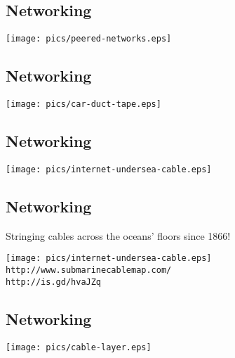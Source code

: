 \documentclass[xga]{xdvislides}
\begin{document}
\subsection{Networking}
\vspace*{\fill}
\begin{center}
	\texttt{[image: pics/peered-networks.eps]} \\
\end{center}
\vspace*{\fill}

\subsection{Networking}
\vspace*{\fill}
\begin{center}
	\texttt{[image: pics/car-duct-tape.eps]} \\
\end{center}
\vspace*{\fill}

\subsection{Networking}
\vspace*{\fill}
\begin{center}
	\texttt{[image: pics/internet-undersea-cable.eps]} \\
\end{center}
\vspace*{\fill}


\subsection{Networking}
Stringing cables across the oceans' floors since 1866!
\vspace*{\fill}
\begin{center}
	\texttt{[image: pics/internet-undersea-cable.eps]} \\
	\verb+http://www.submarinecablemap.com/+ \\
	\verb+http://is.gd/hvaJZq+
\end{center}
\vspace*{\fill}

\subsection{Networking}
\vspace*{\fill}
\begin{center}
	\texttt{[image: pics/cable-layer.eps]} \\
\end{center}
\vspace*{\fill}
\end{document}
